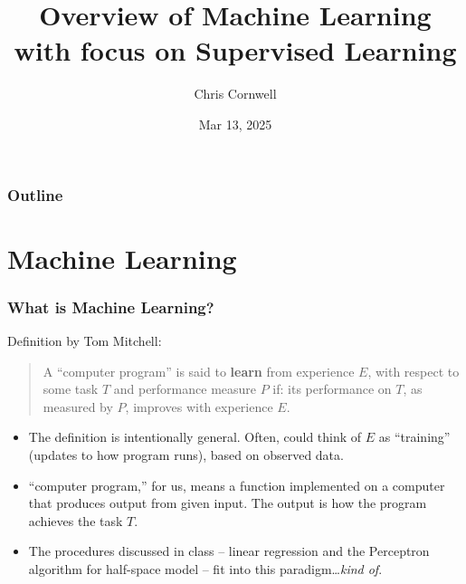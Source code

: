 \documentclass{beamer}
\author{Chris Cornwell}
\date{Mar 13, 2025}
\title{Overview of Machine Learning \newline 
    \footnotesize{with focus on Supervised Learning}}
\theoremstyle{example}
\begin{document}
\begin{frame}
\titlepage
\end{frame}

\begin{frame}
\frametitle{Outline}
\tableofcontents
\end{frame}

\section{Machine Learning}

\begin{frame}
\frametitle{What is Machine Learning?}
    Definition by Tom Mitchell:\newline 
    \begin{quote}
        A ``computer program'' is said to \textbf{learn} from experience $E$, with respect to some task $T$ and performance measure $P$ if: its performance on $T$, as measured by $P$, improves with experience $E$.
    \end{quote}
    \pause
    \begin{itemize}
        \item The definition is intentionally general. Often, could think of $E$ as ``training'' (updates to how program runs), based on observed data.
        \pause
        \item ``computer program,'' for us, means a function implemented on a computer that produces output from given input. The output is how the program achieves the task $T$. 
        \pause
        \item The procedures discussed in class {--} linear regression and the Perceptron algorithm for half-space model {--} fit into this paradigm\ldots \textit{kind of}.
    \end{itemize}

\end{frame}
\end{document}

